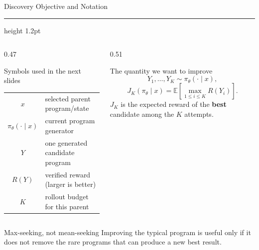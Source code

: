 \documentclass[aspectratio=169]{beamer}
\newcommand{\titlerule}{{\color{titledred}\hrule height 1.2pt}}
\begin{document}
\begin{frame}{Discovery Objective and Notation}
\vspace{-0.35em}
\titlerule
\vspace{0.7em}

\begin{columns}[T,onlytextwidth]
\begin{column}{0.47\textwidth}
\begin{block}{Symbols used in the next slides}
{\footnotesize
\begin{tabular}{@{}cl@{}}
\toprule
$x$ & selected parent program/state \\
$\pi_\theta(\cdot\mid x)$ & current program generator \\
$Y$ & one generated candidate program \\
$R(Y)$ & verified reward (larger is better) \\
$K$ & rollout budget for this parent \\
\bottomrule
\end{tabular}
}
\end{block}
\end{column}

\begin{column}{0.51\textwidth}
\begin{block}{The quantity we want to improve}
\[
Y_1,\ldots,Y_K\sim\pi_\theta(\cdot\mid x),
\]
\vspace{-0.8em}
\[
J_K(\pi_\theta\mid x)
=\mathbb{E}\!\left[\max_{1\le i\le K}R(Y_i)\right].
\]
{\small $J_K$ is the expected reward of the \textbf{best} candidate among the
$K$ attempts.}
\end{block}
\end{column}
\end{columns}

\vspace{0.7em}
\begin{center}
\begin{minipage}{0.86\linewidth}
\begin{block}{Max-seeking, not mean-seeking}
\centering
Improving the typical program is useful only if it does not remove the rare
programs that can produce a new best result.
\end{block}
\end{minipage}
\end{center}
\end{frame}


\end{document}
